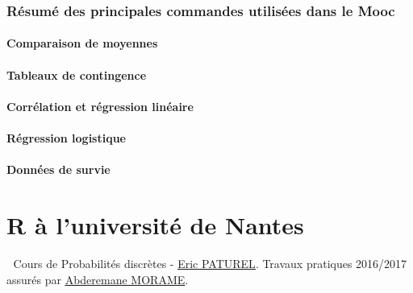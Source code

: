 \section{Résumé des principales commandes utilisées dans le Mooc}
\subsection{Comparaison de moyennes} 
\subsection{Tableaux de contingence}
\subsection{Corrélation et régression linéaire}
\subsection{Régression logistique}
\subsection{Données de survie}
 
\newpage


\part{R à l'université de Nantes}

\textcolor{white}{.}\newline
Cours de Probabilités discrètes - \href{http://www.math.sciences.univ-nantes.fr/~paturel/index.php}{\underline{Eric PATUREL}}. \newline
Travaux pratiques 2016/2017 assurés par \href{http://www.math.sciences.univ-nantes.fr/fr/membres/259}{\underline{Abderemane MORAME}}. 
